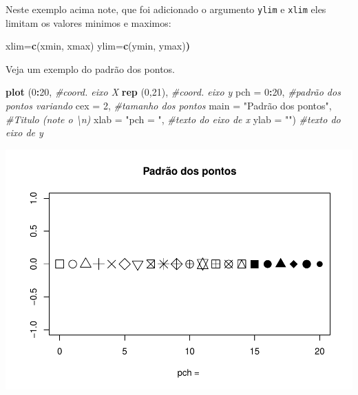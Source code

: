 \documentclass[
]{book}
\newenvironment{Shaded}{\begin{snugshade}}{\end{snugshade}}
\newcommand{\CommentTok}[1]{\textcolor[rgb]{0.56,0.35,0.01}{\textit{#1}}}
\newcommand{\DataTypeTok}[1]{\textcolor[rgb]{0.13,0.29,0.53}{#1}}
\newcommand{\DecValTok}[1]{\textcolor[rgb]{0.00,0.00,0.81}{#1}}
\newcommand{\ErrorTok}[1]{\textcolor[rgb]{0.64,0.00,0.00}{\textbf{#1}}}
\newcommand{\KeywordTok}[1]{\textcolor[rgb]{0.13,0.29,0.53}{\textbf{#1}}}
\newcommand{\NormalTok}[1]{#1}
\newcommand{\OperatorTok}[1]{\textcolor[rgb]{0.81,0.36,0.00}{\textbf{#1}}}
\newcommand{\StringTok}[1]{\textcolor[rgb]{0.31,0.60,0.02}{#1}}
\begin{document}
Neste exemplo acima note, que foi adicionado o argumento \texttt{ylim} e \texttt{xlim} eles limitam os valores minimos e maximos:

\begin{Shaded}
\begin{Highlighting}[]
\NormalTok{xlim=}\KeywordTok{c}\NormalTok{(xmin, xmax) ylim=}\KeywordTok{c}\NormalTok{(ymin, ymax)}\ErrorTok{)}
\end{Highlighting}
\end{Shaded}

Veja um exemplo do padrão dos pontos.

\begin{Shaded}
\begin{Highlighting}[]
\KeywordTok{plot}\NormalTok{ (}\DecValTok{0}\OperatorTok{:}\DecValTok{20}\NormalTok{,                         }\CommentTok{#coord. eixo X}
      \KeywordTok{rep}\NormalTok{ (}\DecValTok{0}\NormalTok{,}\DecValTok{21}\NormalTok{),                   }\CommentTok{#coord. eixo y}
      \DataTypeTok{pch =} \DecValTok{0}\OperatorTok{:}\DecValTok{20}\NormalTok{,                   }\CommentTok{#padrão dos pontos variando}
      \DataTypeTok{cex =} \DecValTok{2}\NormalTok{,                      }\CommentTok{#tamanho dos pontos}
      \DataTypeTok{main =} \StringTok{"Padrão dos pontos"}\NormalTok{, }\CommentTok{#Titulo (note o \textbackslash{}n)}
      \DataTypeTok{xlab =} \StringTok{"pch = "}\NormalTok{,              }\CommentTok{#texto do eixo de x}
      \DataTypeTok{ylab =} \StringTok{""}\NormalTok{)                    }\CommentTok{#texto do eixo de y}
\end{Highlighting}
\end{Shaded}

\includegraphics{TudodoR_files/figure-latex/unnamed-chunk-157-1.pdf}
\end{document}
